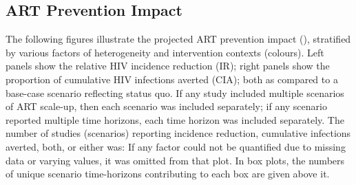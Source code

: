 \subsection{ART Prevention Impact}\label{app.sr.res.api}
The following figures illustrate the projected ART prevention impact (),
stratified by various factors of heterogeneity and intervention contexts (colours).
Left panels show the relative HIV incidence reduction (IR);
right panels show the proportion of cumulative HIV infections averted (CIA);
both as compared to a base-case scenario reflecting status quo.
If any study included multiple scenarios of ART scale-up,
then each scenario was included separately;
if any scenario reported multiple time horizons,
each time horizon was included separately.
The number of studies (scenarios) reporting
incidence reduction, cumulative infections averted, both, or either was:
If any factor could not be quantified due to missing data or varying values,
it was omitted from that plot.
In box plots, the numbers of unique scenario time-horizons
contributing to each box are given above it.
